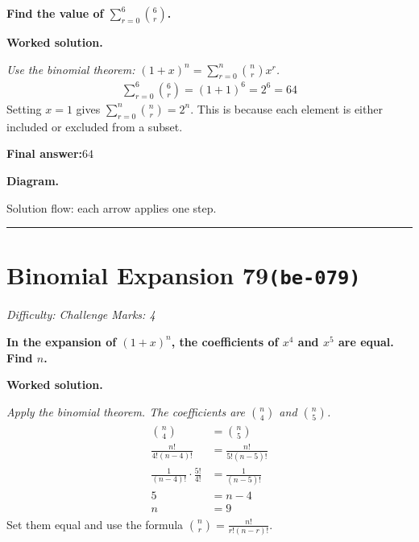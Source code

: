 \documentclass[11pt]{article}
\newcommand{\question}[1]{\par\medskip\noindent\textbf{#1}\par}
\begin{document}
\question{Find the value of \( \sum_{r=0}^{6} \binom{6}{r} \).}

\textbf{Worked solution.}

\textit{Use the binomial theorem: \((1+x)^n = \sum_{r=0}^{n} \binom{n}{r} x^r\).}
\[\begin{gathered}
\sum_{r=0}^{6} \binom{6}{r} = (1+1)^6 = 2^6 = 64
\end{gathered}\]
Setting \(x = 1\) gives \(\sum_{r=0}^{n} \binom{n}{r} = 2^n\). This is because each element is either included or excluded from a subset.

\begin{answerbox}
\textbf{Final answer:}\quad \(\displaystyle 64\)
\end{answerbox}
\textbf{Diagram.}

\begin{center}
\end{center}
\small Solution flow: each arrow applies one step.\normalsize

\medskip\hrule

\section*{Binomial Expansion 79\quad\small\texttt{(be-079)}}
\textit{Difficulty: Challenge \quad\textbar\quad Marks: 4}

\question{In the expansion of \( (1 + x)^n \), the coefficients of \( x^4 \) and \( x^5 \) are equal. Find \( n \).}

\textbf{Worked solution.}

\textit{Apply the binomial theorem. The coefficients are \(\binom{n}{4}\) and \(\binom{n}{5}\).}
\[\begin{gathered}
\begin{aligned} \binom{n}{4} &= \binom{n}{5} \\ \frac{n!}{4!(n-4)!} &= \frac{n!}{5!(n-5)!} \\ \frac{1}{(n-4)!} \cdot \frac{5!}{4!} &= \frac{1}{(n-5)!} \\ 5 &= n - 4 \\ n &= 9 \end{aligned}
\end{gathered}\]
Set them equal and use the formula \(\binom{n}{r} = \frac{n!}{r!(n-r)!}\).
\end{document}
